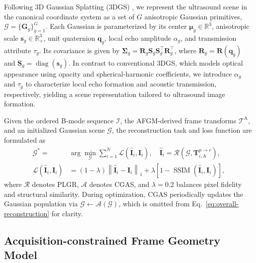 Following 3D Gaussian Splatting (3DGS)
\cite{kerbl3DGaussianSplatting2023}, we represent the ultrasound scene in the
canonical coordinate system as a set of $G$ anisotropic Gaussian primitives,
$\mathcal G=\{\mathbf G_g\}_{g=1}^{G}$. Each Gaussian is parameterized by its
center $\boldsymbol\mu_g\in\mathbb R^3$, anisotropic scale
$\mathbf s_g\in\mathbb R_+^3$, unit quaternion $\mathbf q_g$, local echo
amplitude $\alpha_g$, and transmission attribute $\tau_g$. Its covariance is
given by
$\boldsymbol\Sigma_g
=
\mathbf R_g\mathbf S_g\mathbf S_g^\top\mathbf R_g^\top$,
where $\mathbf R_g=\mathbf R(\mathbf q_g)$ and
$\mathbf S_g=\operatorname{diag}(\mathbf s_g)$. In contrast to conventional
3DGS, which models optical appearance using opacity and spherical-harmonic
coefficients, we introduce $\alpha_g$ and $\tau_g$ to characterize local echo
formation and acoustic transmission, respectively, yielding a scene
representation tailored to ultrasound image formation.

Given the ordered B-mode sequence $\mathcal I$, the AFGM-derived frame
transforms $\mathcal T^{\mathrm A}$, and an initialized Gaussian scene
$\mathcal G$, the reconstruction task and loss function are formulated as
\begin{equation}
\begin{aligned}
\mathcal G^{*}
={}&
\arg\min_{\mathcal G}
\sum_{i=1}^{N}
\mathcal L
\left(
\widehat{\mathbf I}_i,
\mathbf I_i
\right),
\quad
\widehat{\mathbf I}_i
=
\mathcal R
\left(
\mathcal G,
\mathbf T_{i,\mathrm A}^{p\rightarrow c}
\right),
\\
\mathcal L
\left(
\widehat{\mathbf I}_i,
\mathbf I_i
\right)
&=
(1-\lambda)
\left\|
\widehat{\mathbf I}_i-\mathbf I_i
\right\|_1
+
\lambda
\left[
1-
\operatorname{SSIM}
\left(
\widehat{\mathbf I}_i,
\mathbf I_i
\right)
\right],
\end{aligned}
\label{eq:overall-reconstruction}
\end{equation}
where $\mathcal R$ denotes PLGR, $\mathcal A$ denotes CGAS, and $\lambda=0.2$
balances pixel fidelity and structural similarity. During optimization, CGAS
periodically updates the Gaussian population via
$\mathcal G\leftarrow\mathcal A(\mathcal G)$, which is omitted from
Eq.~\eqref{eq:overall-reconstruction} for clarity.

\vspace{-3mm}
\subsection{Acquisition-constrained Frame Geometry Model}
\label{sec:method:acquisition-constrained-frame-geometry-model}

